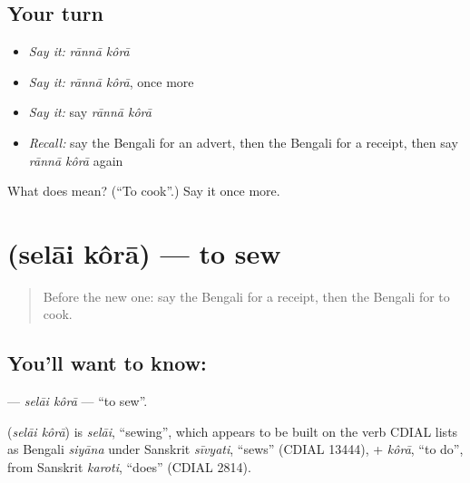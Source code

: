 \subsection*{Your turn}
\begin{itemize}
\raggedright
  \item \emph{Say it:} \emph{rānnā kôrā}
  \item \emph{Say it:} \emph{rānnā kôrā}, once more
  \item \emph{Say it:} say \emph{rānnā kôrā}
  \item \emph{Recall:} say the Bengali for an advert, then the Bengali for a receipt, then say \emph{rānnā kôrā} again
\end{itemize}

\begin{tcolorbox}[breakable,colback=teal!4,colframe=teal!35!black,title={Before you move on}]
What does   mean? (\textquotedblleft{}To cook\textquotedblright{}.) Say it once more.
\end{tcolorbox}
\section[\texorpdfstring{\bn{সেলাই} \bn{করা} (selāi kôrā)}{সেলাই করা (selāi kôrā)}]{  (selāi kôrā) — to sew}

\label{lesson:BN-C148-selai-kora}



\begin{quote}
Before the new one: say the Bengali for a receipt, then the Bengali for to cook.
\end{quote}

\subsection*{You'll want to know:  }
\textbf{ } — \emph{selāi kôrā} — \textquotedblleft{}to sew\textquotedblright{}.

\begin{cousinweb}
\textbf{ } (\emph{selāi kôrā}) is \emph{selāi}, \textquotedblleft{}sewing\textquotedblright{}, which appears to be built on the verb CDIAL lists as Bengali \emph{siyāna} under Sanskrit \emph{sīvyati}, \textquotedblleft{}sews\textquotedblright{} (CDIAL 13444), + \emph{kôrā}, \textquotedblleft{}to do\textquotedblright{}, from Sanskrit \emph{karoti}, \textquotedblleft{}does\textquotedblright{} (CDIAL 2814).
\end{cousinweb}

